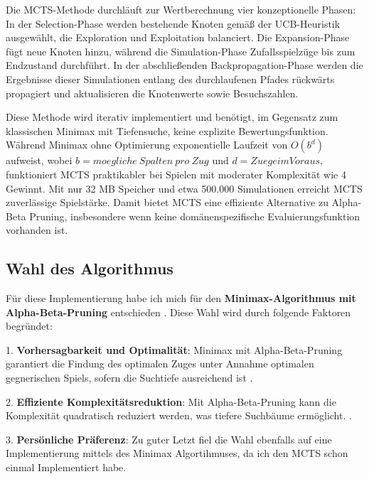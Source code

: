 Die MCTS-Methode durchläuft zur Wertberechnung vier konzeptionelle Phasen: In der Selection-Phase werden bestehende Knoten gemäß der UCB-Heuristik ausgewählt, die Exploration und Exploitation balanciert. Die Expansion-Phase fügt neue Knoten hinzu, während die Simulation-Phase Zufallsspielzüge bis zum Endzustand durchführt. In der abschließenden Backpropagation-Phase werden die Ergebnisse dieser Simulationen entlang des durchlaufenen Pfades rückwärts propagiert und aktualisieren die Knotenwerte sowie Besuchszahlen.

Diese Methode wird iterativ implementiert und benötigt, im Gegensatz zum klassischen Minimax mit Tiefensuche, keine explizite Bewertungsfunktion. Während Minimax ohne Optimierung exponentielle Laufzeit von $O(b^d)$ aufweist, wobei $b = moegliche \ Spalten \ pro \ Zug$ und $d = Zuege im Voraus$, funktioniert MCTS praktikabler bei Spielen mit moderater Komplexität wie 4 Gewinnt. Mit nur 32 MB Speicher und etwa 500.000 Simulationen erreicht MCTS zuverlässige Spielstärke. Damit bietet MCTS eine effiziente Alternative zu Alpha-Beta Pruning, insbesondere wenn keine domänenspezifische Evaluierungsfunktion vorhanden ist.

\subsection{Wahl des Algorithmus}
\label{wahl}
Für diese Implementierung habe ich mich für den \textbf{Minimax-Algorithmus mit Alpha-Beta-Pruning} entschieden \cite{Solr-627596169, KNUTH1975293}. Diese Wahl wird durch folgende Faktoren begründet:

1. \textbf{Vorhersagbarkeit und Optimalität}: Minimax mit Alpha-Beta-Pruning garantiert die Findung des optimalen Zuges unter Annahme optimalen gegnerischen Spiels, sofern die Suchtiefe ausreichend ist \cite{Solr-627596169}.

2. \textbf{Effiziente Komplexitätsreduktion}: Mit Alpha-Beta-Pruning kann die Komplexität quadratisch reduziert werden, was tiefere Suchbäume ermöglicht. \cite{KNUTH1975293}.

3. \textbf{Persönliche Präferenz}: Zu guter Letzt fiel die Wahl ebenfalls auf eine Implementierung mittels des Minimax Algortihmuses, da ich den MCTS schon einmal Implementiert habe.

\newpage

